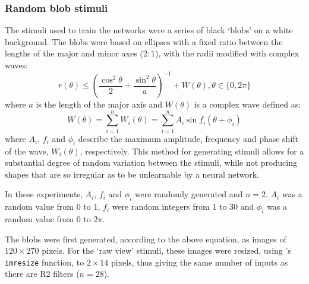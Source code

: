 \subsubsection*{Random blob stimuli}
\label{sec:methods:stimuli}
The stimuli used to train the networks were a series of black `blobs' on a white background.
The blobs were based on ellipses with a fixed ratio between the lengths of the major and minor axes ($2:1$), with the radii modified with complex waves:
$$
r(\theta) \le \left(\frac{\cos^2 \theta}{2} + \frac{\sin^2 \theta}{a} \right)^{-1} + W(\theta), \theta \in \{0, 2\pi\}
$$
where $a$ is the length of the major axis and $W(\theta)$ is a complex wave defined as:
$$
W(\theta) = \sum_{i=1}^n W_i(\theta) = \sum_{i=1}^n A_i \sin f_i (\theta+\phi_i) 
$$
where $A_i$, $f_i$ and $\phi_i$ describe the maximum amplitude, frequency and phase shift of the wave, $W_i(\theta)$, respectively.
This method for generating stimuli allows for a substantial degree of random variation between the stimuli, while not producing shapes that are so irregular as to be unlearnable by a neural network.

In these experiments, $A_i$, $f_i$ and $\phi_i$ were randomly generated and $n=2$.
$A_i$ was a random value from 0 to 1, $f_i$ were random integers from 1 to 30 and $\phi_i$ was a random value from 0 to $2\pi$.
\begin{comment}
nvar = 1000;
nwave = 2;
maxfreq = 30;
maxamp = 1;
\end{comment}

The blobs were first generated, according to the above equation, as images of $120\times 270$ pixels.
For the `raw view' stimuli, these images were resized, using \Matlab's \texttt{imresize} function, to $2\times 14$ pixels, thus giving the same number of inputs as there are R2 filters ($n=28$).

\begin{comment}
\subsubsection*{Grading performance of neural networks}
The performance of neural networks was graded by calculating the \ac{rms} difference between the matrix of true values for the parameters with the network's output:
$$
E(\mathbf{y},\mathbf{t}) = \sqrt{\frac{\sum\limits_{i=1}^{n} (\mathbf{y}_i-\mathbf{t}_i)^2}{n}}
$$
where $E(\mathbf{y},\mathbf{t})$ is the mean error score, computed from the vector of outputs given by the network, $\mathbf{y}$, and the vector of true values, $\mathbf{t}$.
Hence, for a network that computed the values of all parameters accurately, a graph of the network's output \emph{vs.} the true values would give the line $y=x$ and an error score of 0 over the whole range of values.
\end{comment}

